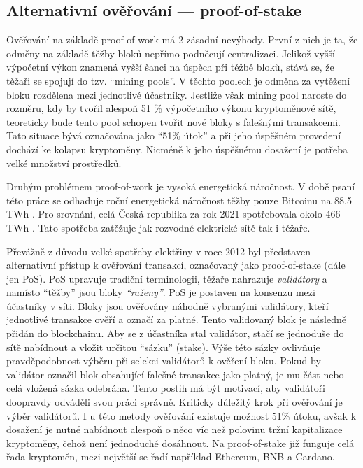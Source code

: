 \subsection{Alternativní ověřování --- proof-of-stake}
\label{proof-of-stake-subsection}
Ověřování na základě proof-of-work má 2 zásadní nevýhody. První z nich je ta, že odměny na základě těžby bloků nepřímo podněcují centralizaci.
Jelikož vyšší výpočetní výkon znamená vyšší šanci na úspěch při těžbě bloků, stává se, že těžaři se spojují do tzv. \enquote{mining pools}.
V těchto poolech je odměna za vytěžení bloku rozdělena mezi jednotlivé účastníky. Jestliže však mining pool naroste do rozměru, kdy by tvořil
alespoň 51 \% výpočetního výkonu kryptoměnové sítě, teoreticky bude tento pool schopen tvořit nové bloky s falešnými transakcemi. Tato situace
bývá označována jako \enquote{51\% útok} a při jeho úspěšném provedení dochází ke kolapsu kryptoměny. Nicméně k jeho úspěšnému dosažení je potřeba velké množství prostředků.

Druhým problémem proof-of-work je vysoká energetická náročnost. V době psaní této práce se odhaduje roční energetická náročnost těžby pouze Bitcoinu
na 88,5 TWh \cite{crypto:energy-consumption-bitcon}. Pro srovnání, celá Česká republika za rok 2021 spotřebovala okolo 466 TWh \cite{crypto:energy-consumption-czechia}.
Tato spotřeba zatěžuje jak rozvodné elektrické sítě tak i těžaře.

Převážně z důvodu velké spotřeby elektřiny v roce 2012 byl představen alternativní přístup k ověřování transakcí, označovaný jako proof-of-stake (dále jen PoS).
PoS upravuje tradiční terminologii, těžaře nahrazuje \emph{validátory} a namísto \enquote{těžby} jsou bloky \emph{\enquote{raženy}}. PoS je 
postaven na konsenzu mezi účastníky v síti. Bloky jsou ověřovány náhodně vybranými validátory, kteří jednotlivé transakce ověří a označí za platné.
Tento validovaný blok je následně přidán do blockchainu. Aby se z účastníka stal validátor, stačí se jednoduše do sítě nabídnout a vložit určitou
\enquote{sázku} (stake). Výše této sázky ovlivňuje pravděpodobnost výběru při selekci validátorů k ověření bloku. Pokud by validátor označil
blok obsahující falešné transakce jako platný, je mu část nebo celá vložená sázka odebrána. Tento postih má být motivací, aby validátoři doopravdy
odváděli svou práci správně. Kriticky důležitý krok při ověřování je výběr validátorů. I u této metody ověřování existuje možnost 51\% útoku,
avšak k dosažení je nutné nabídnout alespoň o něco víc než polovinu tržní kapitalizace kryptoměny, čehož není jednoduché dosáhnout.
Na proof-of-stake již funguje celá řada kryptoměn, mezi největší se řadí například Ethereum, BNB a Cardano.

